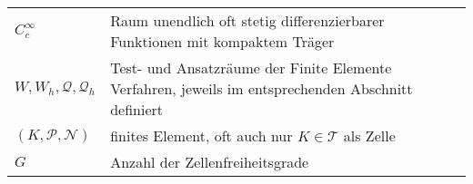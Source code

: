 \begin{longtable}[c]{ p{} p{}}
	$ C_c^{\infty} $ & Raum unendlich oft stetig differenzierbarer Funktionen mit kompaktem  Träger \\
	$ W,W_h,\mathcal{Q},\mathcal{Q}_h $ & Test- und Ansatzräume der Finite Elemente Verfahren, jeweils im entsprechenden Abschnitt definiert\\
	$ (K,\mathcal{P},\mathcal{N}) $ & finites Element, oft auch nur $ K \in \mathcal{T}$ als Zelle \\
	$ G $ & Anzahl der Zellenfreiheitsgrade \\
	\hline
\end{longtable}

